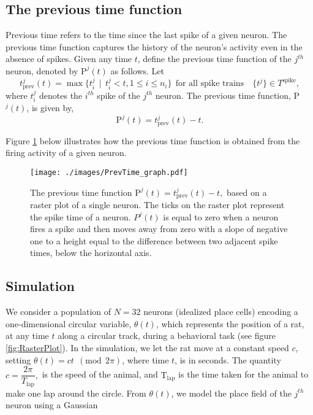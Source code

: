 \subsection{The previous time function}
Previous time refers to the time since the last spike of a given neuron. The previous time function captures the history of the neuron's  activity even in the absence of spikes.
Given any time $t$, define the previous time function of the $j^{th}$ neuron, denoted by $\text{P}^{j}(t)$ as follows. Let 
\[
t^{j}_{\text{prev}}(t) = \displaystyle \max  \{  t^{j}_{i} \ \ | \ \ t^{j}_{i} < t, 1 \leq i \leq n_{i} \} \ \ \text{for all spike trains} \quad  \{t^{j}\} \in T^{\text{spike}}, 
\]
where $t^j_i$ denotes the $i^{th}$ spike of the $j^{th}$ neuron.  The previous time function, P$^{j}(t)$, is given by, 
\begin{equation}\label{prevtimefun}
\text{P}^{j}(t) = t^{j}_{\text{prev}}(t) - t.
\end{equation}


Figure \ref{fig:PrevTime} below illustrates how the previous time function is obtained from the firing activity of a given neuron.


 \begin{figure}[H]
        \centering
          \texttt{[image: ./images/PrevTime\_graph.pdf]}
           \caption[]
            {\small  The previous time function $\text{P}^{j}(t) = t^{j}_{\text{prev}}(t) - t,$ based on a raster plot of a single neuron.   The ticks on the raster plot represent the spike time of a neuron. $P^{j}(t)$ is equal to zero when a neuron fires a spike  and then moves away from zero with a slope of negative one to a height equal to the difference between two adjacent spike times, below the horizontal axis.  } 
             \label{fig:PrevTime}
  \end{figure}


\subsection{Simulation}
We consider a population of $N=32$  neurons (idealized place cells) encoding a 
one-dimensional circular  variable, $\theta(t)$, which represents 
the position of a rat, at any time $t$ along a circular track, during a behavioral task  (see figure \ref{fig:RasterPlot}).
In the simulation, we let the rat move at a constant speed $c$, setting  $\theta(t) = c t \ \ (\text{mod} \ \ 2\pi)$, where time $t$, is in seconds. The quantity  $c = \dfrac{2\pi}{T_{\text{lap}}},$ is the speed of the animal, and
$\text{T}_{\text{lap}}$ is the time taken for the animal to make one lap around the circle.
From  $\theta(t)$,  we model the place field of the $j^{th}$ neuron using a Gaussian 

